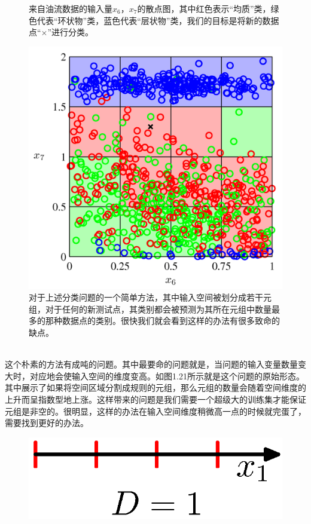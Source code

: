 \documentclass[b5paper]{book}
\numberwithin{equation}{chapter}
\begin{document}
{\begin{figure}[ht]
		\caption{来自油流数据的输入量$x_6$，$x_7$的散点图，其中红色表示“均质”类，绿色代表“环状物”类，蓝色代表“层状物”类，我们的目标是将新的数据点“$\times$”进行分类。}
		\label{fig:1-19}
		\centering
		\includegraphics[scale=0.8]{Images/1-20.png}
		\caption{对于上述分类问题的一个简单方法，其中输入空间被划分成若干元组，对于任何的新测试点，其类别都会被预测为其所在元组中数量最多的那种数据点的类别。很快我们就会看到这样的办法有很多致命的缺点。}
		\label{fig:1-20}
	\end{figure}
	\\
	\indent 这个朴素的方法有成吨的问题。其中最要命的问题就是，当问题的输入变量数量变大时，对应地会使输入空间的维度变高。如图1.21所示就是这个问题的原始形态。其中展示了如果将空间区域分割成规则的元组，那么元组的数量会随着空间维度的上升而呈指数型地上涨。这样带来的问题是我们需要一个超级大的训练集才能保证元组是非空的。很明显，这样的办法在输入空间维度稍微高一点的时候就完蛋了，需要找到更好的办法。
	\begin{figure}[ht]
	\centering
		\begin{minipage}[t]{0.3\linewidth}
		\centering
		\includegraphics[scale=0.8]{Images/1-21a.png}

\end{minipage}
\end{figure}}
\end{document}
